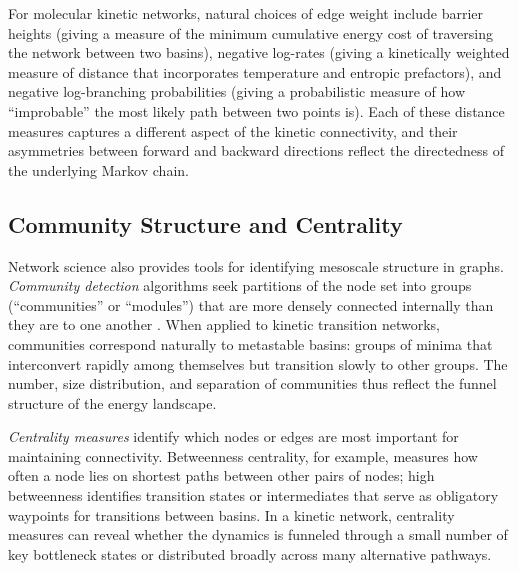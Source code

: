 For molecular kinetic networks, natural choices of edge weight include barrier
heights (giving a measure of the minimum cumulative energy cost of traversing
the network between two basins), negative log-rates (giving a kinetically
weighted measure of distance that incorporates temperature and entropic
prefactors), and negative log-branching probabilities (giving a
probabilistic measure of how ``improbable'' the most likely path between two
points is). Each of these distance measures captures a different aspect of
the kinetic connectivity, and their asymmetries between forward and backward
directions reflect the directedness of the underlying Markov chain.

\subsection{Community Structure and Centrality}

Network science also provides tools for identifying mesoscale structure in
graphs. \emph{Community detection} algorithms seek partitions of the node set
into groups (``communities'' or ``modules'') that are more densely connected
internally than they are to one another
\cite{Newman2006Modularity}. When applied to kinetic
transition networks, communities correspond naturally to metastable basins:
groups of minima that interconvert rapidly among themselves but transition
slowly to other groups. The number, size distribution, and separation of
communities thus reflect the funnel structure of the energy landscape.

\emph{Centrality measures} identify which nodes or edges are most important
for maintaining connectivity. Betweenness centrality, for example, measures
how often a node lies on shortest paths between other pairs of nodes; high
betweenness identifies transition states or intermediates that serve as
obligatory waypoints for transitions between basins. In a kinetic network,
centrality measures can reveal whether the dynamics is funneled through a
small number of key bottleneck states or distributed broadly across many
alternative pathways.

